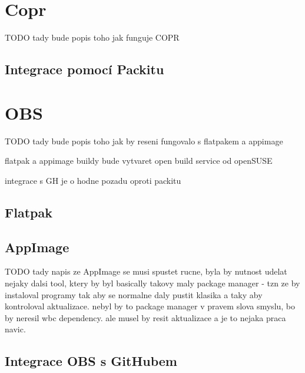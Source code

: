\documentclass[
  digital,     %
  oneside,     %
  nosansbold,  %
  nocolorbold, %
  lof,         %
  lot,         %
]{fithesis4}
\begin{document}

\section{Copr}

TODO tady bude popis toho jak funguje COPR

\subsection{Integrace pomocí Packitu}


\section{OBS}

TODO tady bude popis toho jak by reseni fungovalo s flatpakem a appimage

flatpak a appimage buildy bude vytvaret  open build service od openSUSE

integrace s GH je o hodne pozadu oproti packitu

\subsection{Flatpak}

\subsection{AppImage}

TODO tady napis ze AppImage se musi spustet rucne, byla by nutnost udelat nejaky
dalsi tool, ktery by byl basically takovy maly package manager - tzn ze by instaloval
programy tak aby se normalne daly pustit klasika a taky aby kontroloval aktualizace.
nebyl by to package manager v pravem slova smyslu, bo by neresil wbc dependency.
ale musel by resit aktualizace a je to nejaka praca navic.

\subsection{Integrace OBS s GitHubem}

\end{document}
